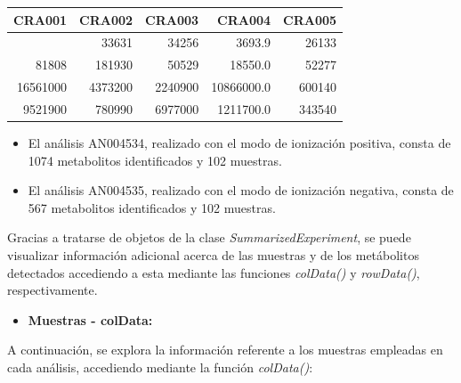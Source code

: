 \documentclass[
]{article}
\newenvironment{Shaded}{\begin{snugshade}}{\end{snugshade}}
\newcommand{\CommentTok}[1]{\textcolor[rgb]{0.56,0.35,0.01}{\textit{#1}}}
\newcommand{\FunctionTok}[1]{\textcolor[rgb]{0.13,0.29,0.53}{\textbf{#1}}}
\newcommand{\NormalTok}[1]{#1}
\newcommand{\OtherTok}[1]{\textcolor[rgb]{0.56,0.35,0.01}{#1}}
\newcommand{\SpecialCharTok}[1]{\textcolor[rgb]{0.81,0.36,0.00}{\textbf{#1}}}
\providecommand{\tightlist}{%
  \setlength{\itemsep}{0pt}\setlength{\parskip}{0pt}}
\begin{document}
\begin{longtable}[]{@{}rrrrr@{}}
\toprule\noalign{}
CRA001 & CRA002 & CRA003 & CRA004 & CRA005 \\
\midrule\noalign{}
\endhead
\bottomrule\noalign{}
\endlastfoot
16205 & 33631 & 34256 & 3693.9 & 26133 \\
81808 & 181930 & 50529 & 18550.0 & 52277 \\
16561000 & 4373200 & 2240900 & 10866000.0 & 600140 \\
9521900 & 780990 & 6977000 & 1211700.0 & 343540 \\
\end{longtable}

\begin{itemize}
\tightlist
\item
  El análisis AN004534, realizado con el modo de ionización positiva,
  consta de 1074 metabolitos identificados y 102 muestras.\\
\item
  El análisis AN004535, realizado con el modo de ionización negativa,
  consta de 567 metabolitos identificados y 102 muestras.
\end{itemize}

Gracias a tratarse de objetos de la clase \emph{SummarizedExperiment},
se puede visualizar información adicional acerca de las muestras y de
los metábolitos detectados accediendo a esta mediante las funciones
\emph{colData()} y \emph{rowData()}, respectivamente.

\begin{itemize}
\tightlist
\item
  \textbf{Muestras - colData:}
\end{itemize}

A continuación, se explora la información referente a los muestras
empleadas en cada análisis, accediendo mediante la función
\emph{colData()}:

\begin{Shaded}
\end{Shaded}
\end{document}
